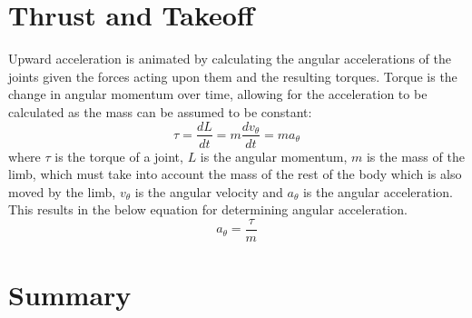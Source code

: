 \section{Thrust and Takeoff}
Upward acceleration is animated by calculating the angular accelerations of the joints given the forces acting upon them and the resulting torques.  Torque is the change in angular momentum over time, allowing for the acceleration to be calculated as the mass can be assumed to be constant: \[\tau = \dfrac{dL}{dt} = m \dfrac{dv_{\theta}}{dt} = m a_{\theta}\] where $\tau$ is the torque of a joint, $L$ is the angular momentum, $m$ is the mass of the limb, which must take into account the mass of the rest of the body which is also moved by the limb, $v_{\theta}$ is the angular velocity and $a_{\theta}$ is the angular acceleration. This results in the below equation for determining angular acceleration. \[a_{\theta} = \dfrac{\tau}{m}\]

\section{Summary}
\label{section:animation_summary}